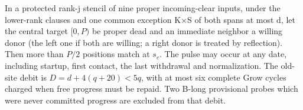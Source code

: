 \begin{lemma}\label{lem:advance}
In a protected rank-j stencil of nine proper incoming-clear inputs, under the lower-rank clauses and one common exception K\(\times\)S of both spans at most d, let the central target \([0,P)\) be proper dead and an immediate neighbor a willing donor (the left one if both are willing; a right donor is treated by reflection). Then more than \(P/2\) positions match at \(s_c\). The pulse may occur at any date, including startup, first contact, the last withdrawal and normalization. The old-site debit is \(D=d+4(q+20)<5q\), with at most six complete Grow cycles charged when free progress must be repaid. Two B-long provisional probes which were never committed progress are excluded from that debit.
\end{lemma}
